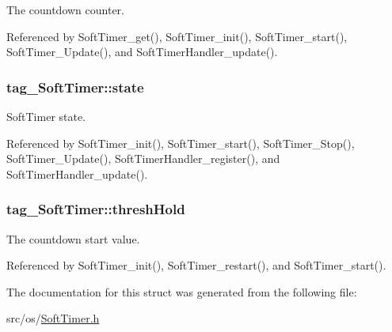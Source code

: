 The countdown counter. 



Referenced by Soft\+Timer\+\_\+get(), Soft\+Timer\+\_\+init(), Soft\+Timer\+\_\+start(), Soft\+Timer\+\_\+\+Update(), and Soft\+Timer\+Handler\+\_\+update().

\hypertarget{structtag___soft_timer_af62379b52047ab99128f9a4b62905bc2}{
\subsubsection[{state}]{ tag\+\_\+\+Soft\+Timer\+::state}}\label{structtag___soft_timer_af62379b52047ab99128f9a4b62905bc2}


Soft\+Timer state. 



Referenced by Soft\+Timer\+\_\+init(), Soft\+Timer\+\_\+start(), Soft\+Timer\+\_\+\+Stop(), Soft\+Timer\+\_\+\+Update(), Soft\+Timer\+Handler\+\_\+register(), and Soft\+Timer\+Handler\+\_\+update().

\hypertarget{structtag___soft_timer_aa7b3fcf408e6ac60c9fc94ce0f202285}{
\subsubsection[{thresh\+Hold}]{ tag\+\_\+\+Soft\+Timer\+::thresh\+Hold}}\label{structtag___soft_timer_aa7b3fcf408e6ac60c9fc94ce0f202285}


The countdown start value. 



Referenced by Soft\+Timer\+\_\+init(), Soft\+Timer\+\_\+restart(), and Soft\+Timer\+\_\+start().



The documentation for this struct was generated from the following file\+:\begin{DoxyCompactItemize}
\item 
src/os/\hyperlink{_soft_timer_8h}{Soft\+Timer.\+h}\end{DoxyCompactItemize}
